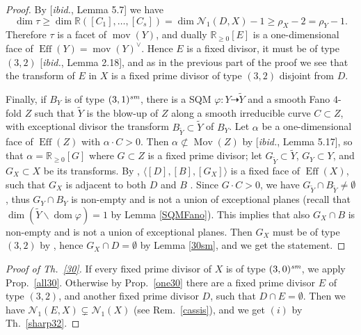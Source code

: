 \documentclass[a4paper,12pt]{amsart}
\theoremstyle{definition}
\numberwithin{figure}{section}
\numberwithin{table}{section}
\newcommand{\ph}{\varphi}
\newcommand{\w}{\widetilde}
\newcommand{\R}{\mathbb{R}}
\newcommand{\N}{\mathcal{N}_1}
\newcommand{\dom}{\operatorname{dom}}
\newcommand{\Eff}{\operatorname{Eff}}
\newcommand{\Mov}{\operatorname{Mov}}
\newcommand{\mov}{\operatorname{mov}}
\newcommand{\sm}{\text{\it sm}}
\begin{document}
\begin{proof}
By [\emph{ibid.}, Lemma 5.7] we have
$$\dim\tau\geq\dim\R([C_1],\dotsc,[C_s])=\dim\N(D,X)-1\geq\rho_X-2=\rho_Y-1.$$
Therefore $\tau$ is a facet of $\mov(Y)$, and dually $\R_{\geq 0}[E]$ is a one-dimensional face of $\Eff(Y)=\mov(Y)^{\vee}$. Hence $E$ is a fixed divisor, it must be of type $(3,2)$ [\emph{ibid.}, Lemma 2.18], and as in the previous part of the proof we see that the transform of $E$ in $X$ is a fixed prime divisor of type $(3,2)$ disjoint from $D$.

\medskip

Finally, if $B_Y$ is of type $(3,1)^{\sm}$, there is a SQM $\ph\colon Y\dasharrow \w{Y}$ and a smooth Fano $4$-fold $Z$ such that $\w{Y}$ is the blow-up of $Z$ along a smooth irreducible curve $C\subset Z$, with exceptional divisor the transform $B_{\w{Y}}\subset\w{Y}$ of $B_Y$. Let $\alpha$ be a one-dimensional face of $\Eff(Z)$ with $\alpha\cdot C>0$. Then $\alpha\not\subset\Mov(Z)$ by [\emph{ibid.}, Lemma 5.17], so that $\alpha=\R_{\geq 0}[G]$ where $G\subset Z$ is a fixed prime divisor; let  $G_{\w{Y}}\subset\w{Y}$, $G_Y\subset Y$, and $G_X\subset X$ be its transforms. 
By \cite[Lemmas 4.2 and 4.4]{small}, $\langle [D],[B],[G_X]\rangle$ is a fixed face of $\Eff(X)$, 
such that $G_X$ is adjacent to both $D$ and $B$ .
Since $G\cdot C>0$, we have $G_{\w{Y}}\cap B_{\w{Y}}\neq\emptyset$, thus $G_Y\cap B_Y$ is non-empty and is not a union of exceptional planes (recall that $\dim (\w{Y}\smallsetminus \dom\ph)=1$ by Lemma \ref{SQMFano}). This implies that also 
$G_X\cap B$   is non-empty and is not a union of exceptional planes. Then  $G_X$ must be of type $(3,2)$ by \cite[Lemma 4.13(b)]{small}, hence $G_X\cap D=\emptyset$ by Lemma \ref{30sm}, and we get the statement.
\end{proof} 
\begin{proof}[Proof of Th.~\ref{30}]
  If every fixed prime divisor of $X$ is of type $(3,0)^{\sm}$, we apply Prop.~\ref{all30}. Otherwise  by  Prop.~\ref{one30} there are a fixed prime divisor $E$ of type $(3,2)$, and another fixed prime divisor $D$, such that
$D\cap E=\emptyset$. Then we have $\N(E,X)\subsetneq\N(X)$ (see Rem.~\ref{cassis}), and we get $(i)$
by Th.~\ref{sharp32}.
\end{proof}  
\end{document}
